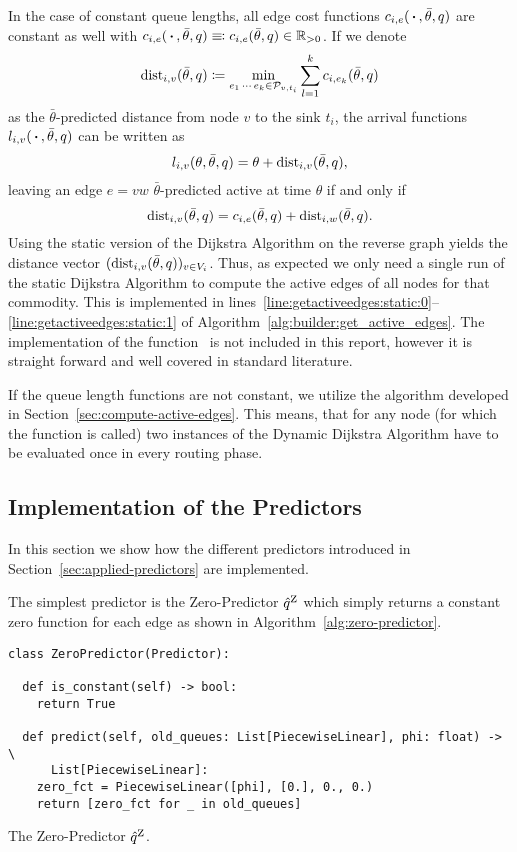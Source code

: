 In the case of constant queue lengths, all edge cost functions $c_{i,e}(\,\boldsymbol{\cdot}\,,\bar\theta,q)$ are constant as well with $c_{i,e}(\,\boldsymbol{\cdot}\,,\bar\theta,q)\equiv\mspace{-1.2mu}\vcentcolon c_{i,e}(\bar\theta,q) \in \mathbb{R}_{>0}$.
If we denote \[
  \textrm{dist}_{i,v}(\bar\theta, q)\coloneqq \min_{e_1\,\cdots\,e_k\in\mathcal{P}_{v,t_i}} \sum_{l=1}^k c_{i,e_k}(\bar\theta, q)
\]
as the $\bar\theta$-predicted distance from node $v$ to the sink $t_i$, the arrival functions $l_{i,v}(\,\boldsymbol{\cdot}\,, \bar\theta, q)$ can be written as \[
  l_{i,v}(\theta, \bar\theta, q) = \theta + \textrm{dist}_{i,v}(\bar\theta, q),
\]
leaving an edge $e=vw$ $\bar\theta$-predicted active at time $\theta$ if and only if \[
  \textrm{dist}_{i,v}(\bar\theta, q) = c_{i,e}(\bar\theta, q) + \textrm{dist}_{i,w}(\bar\theta, q).
\]
Using the static version of the Dijkstra Algorithm on the reverse graph yields the distance vector $(\textrm{dist}_{i,v}(\bar\theta, q))_{v\in V_i}$.
Thus, as expected we only need a single run of the static Dijkstra Algorithm to compute the active edges of all nodes for that commodity.
This is implemented in lines~\ref{line:getactiveedges:static:0}--\ref{line:getactiveedges:static:1} of Algorithm~\ref{alg:builder:get_active_edges}.
The implementation of the function~ is not included in this report, however it is straight forward and well covered in standard literature.  

If the queue length functions are not constant, we utilize the algorithm developed in Section~\ref{sec:compute-active-edges}.
This means, that for any node (for which the function  is called) two instances of the Dynamic Dijkstra Algorithm have to be evaluated once in every routing phase. 


\subsection{Implementation of the Predictors}\label{subsec:implementation-predictors}

In this section we show how the different predictors introduced in Section~\ref{sec:applied-predictors} are implemented.


The simplest predictor is the Zero-Predictor $\hat q^{\text{Z}}$ which simply returns a constant zero function for each edge as shown in Algorithm~\ref{alg:zero-predictor}.

\begin{algorithm}[H]
  \begin{verbatim}
class ZeroPredictor(Predictor):

  def is_constant(self) -> bool:
    return True

  def predict(self, old_queues: List[PiecewiseLinear], phi: float) -> \
      List[PiecewiseLinear]:
    zero_fct = PiecewiseLinear([phi], [0.], 0., 0.)
    return [zero_fct for _ in old_queues]
\end{verbatim}
\caption{The Zero-Predictor $\hat q^{\text{Z}}$.}
\label{alg:zero-predictor}
\end{algorithm}

